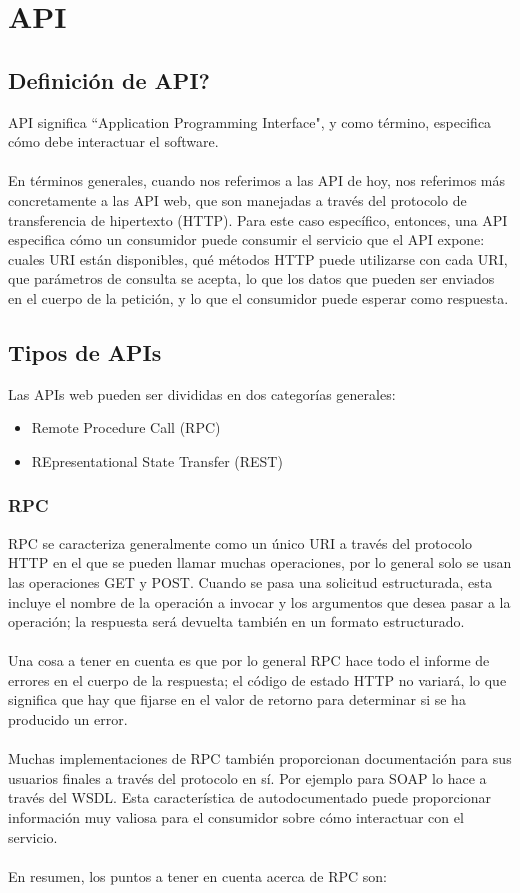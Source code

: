 \chapter{API}
\label{capapi}

\section{Definición de API?}
API significa ``Application Programming Interface", y como término, especifica cómo debe interactuar el software.\\
\\
En términos generales, cuando nos referimos a las API de hoy, nos referimos más concretamente a las API web, que son manejadas a través del protocolo de transferencia de hipertexto (HTTP). Para este caso específico, entonces, una API especifica cómo un consumidor puede consumir el servicio que el API expone: cuales URI están disponibles, qué métodos HTTP puede utilizarse con cada URI, que parámetros de consulta se acepta, lo que los datos que pueden ser enviados en el cuerpo de la petición, y lo que el consumidor puede esperar como respuesta.

\section{Tipos de APIs}
Las APIs web pueden ser divididas en dos categorías generales:
\begin{itemize}
\item Remote Procedure Call (RPC)
\item REpresentational State Transfer (REST)
\end{itemize}

\subsection{RPC}
RPC se caracteriza generalmente como un único URI a través del protocolo HTTP en el que se pueden llamar muchas operaciones, por lo general solo se usan las operaciones GET y POST. Cuando se pasa una solicitud estructurada, esta incluye el nombre de la operación a invocar y los argumentos que desea pasar a la operación; la respuesta será devuelta también en un formato estructurado.\\
\\
Una cosa a tener en cuenta es que por lo general RPC hace todo el informe de errores en el cuerpo de la respuesta; el código de estado HTTP no variará, lo que significa que hay que fijarse en el valor de retorno para determinar si se ha producido un error.\\
\\
Muchas implementaciones de RPC también proporcionan documentación para sus usuarios finales a través del protocolo en sí. Por ejemplo para SOAP lo hace a través del WSDL. Esta característica de autodocumentado puede proporcionar información muy valiosa para el consumidor sobre cómo interactuar con el servicio.\\
\\
En resumen, los puntos a tener en cuenta acerca de RPC son:

